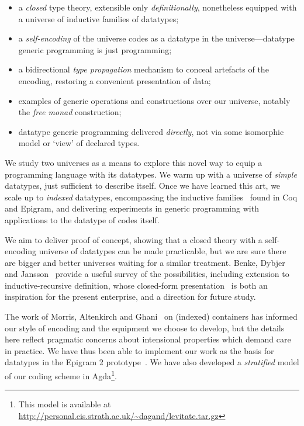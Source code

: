 \documentclass[authoryear]{sigplanconf}
\begin{document}
\begin{itemize}
\item a \emph{closed} type theory, extensible only \emph{definitionally},
  nonetheless equipped with a universe of inductive families of datatypes;
\item a \emph{self-encoding} of the universe codes as a datatype in the
  universe---datatype generic programming is just programming;
\item a bidirectional \emph{type propagation} mechanism to conceal
  artefacts of the encoding, restoring
  a convenient presentation of data;
\item examples of generic operations and constructions over our universe,
  notably the \emph{free monad} construction;
\item datatype generic programming delivered \emph{directly},
  not via some isomorphic
  model or `view' of declared types.
\end{itemize}

We study two universes as a means to explore this novel way to equip a
programming language with its datatypes. We warm up with a universe of
\emph{simple} datatypes, just sufficient to describe itself. Once we
have learned this art, we scale up to \emph{indexed} datatypes,
encompassing the inductive families~\cite{dybjer:families,luo:utt}
found in Coq and Epigram, and delivering experiments in generic
programming with applications to the datatype of codes itself.

We aim to deliver proof of concept, showing that a closed theory with
a self-encoding universe of datatypes can be made practicable, but we
are sure there are bigger and better universes waiting for a similar
treatment. Benke, Dybjer and
Jansson~\cite{benke:universe-generic-prog} provide a useful survey of
the possibilities, including extension to inductive-recursive
definition, whose closed-form presentation~\cite{dybjer:axiom-ir,
  dybjer:ir-initial-algebra} is both an inspiration for the present
enterprise, and a direction for future study.

The work of Morris, Altenkirch and
Ghani~\cite{morris:PhD,morris:spf,alti:lics09} on
(indexed) containers has informed our style of encoding and the
equipment we choose to develop, but the details here reflect pragmatic
concerns about intensional properties which demand care in
practice. We have thus been able to implement our work as the basis
for datatypes in the Epigram 2 prototype~\cite{pigs:epigram}. We
have also developed a \emph{stratified} model of our coding scheme
in Agda\footnote{This model is available at \\
\url{http://personal.cis.strath.ac.uk/~dagand/levitate.tar.gz}}.
\end{document}
